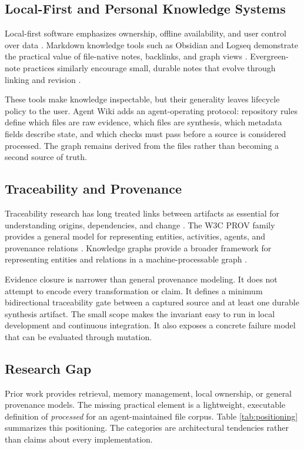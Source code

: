 \documentclass[preprint,12pt,a4paper]{elsarticle}
\begin{document}
\subsection{Local-First and Personal Knowledge Systems}

Local-first software emphasizes ownership, offline availability, and user
control over data \cite{kleppmann2019localfirst}. Markdown knowledge tools such
as Obsidian and Logseq demonstrate the practical value of file-native notes,
backlinks, and graph views \cite{obsidian,logseq}. Evergreen-note practices
similarly encourage small, durable notes that evolve through linking and
revision \cite{matuschakEvergreen}.

These tools make knowledge inspectable, but their generality leaves lifecycle
policy to the user. Agent Wiki adds an agent-operating protocol: repository
rules define which files are raw evidence, which files are synthesis, which
metadata fields describe state, and which checks must pass before a source is
considered processed. The graph remains derived from the files rather than
becoming a second source of truth.

\subsection{Traceability and Provenance}

Traceability research has long treated links between artifacts as essential
for understanding origins, dependencies, and change \cite{gotel1994trace}.
The W3C PROV family provides a general model for representing entities,
activities, agents, and provenance relations \cite{w3cprov}. Knowledge graphs
provide a broader framework for representing entities and relations in a
machine-processable graph \cite{hogan2021knowledgegraphs}.

Evidence closure is narrower than general provenance modeling. It does not
attempt to encode every transformation or claim. It defines a minimum
bidirectional traceability gate between a captured source and at least one
durable synthesis artifact. The small scope makes the invariant easy to run in
local development and continuous integration. It also exposes a concrete
failure model that can be evaluated through mutation.

\subsection{Research Gap}

Prior work provides retrieval, memory management, local ownership, or general
provenance models. The missing practical element is a lightweight, executable
definition of \emph{processed} for an agent-maintained file corpus. Table
\ref{tab:positioning} summarizes this positioning. The categories are
architectural tendencies rather than claims about every implementation.
\end{document}
